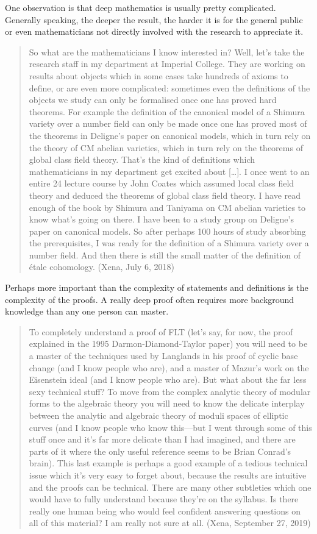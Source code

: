 \documentclass{amsart}
\theoremstyle{definition}
\theoremstyle{remark}
\numberwithin{equation}{section}
\begin{document}
One observation is that deep mathematics is usually pretty complicated. Generally speaking, the deeper the result, the harder it is for the general public or even mathematicians not directly involved with the research to appreciate it.
\begin{quote}
  So what are the mathematicians I know interested in? Well, let’s take the research staff in my department at Imperial College. They are working on results about objects which in some cases take hundreds of axioms to define, or are even more complicated: sometimes even the definitions of the objects we study can only be formalised once one has proved hard theorems. For example the definition of the canonical model of a Shimura variety over a number field can only be made once one has proved most of the theorems in Deligne's paper on canonical models, which in turn rely on the theory of CM abelian varieties, which in turn rely on the theorems of global class field theory. That's the kind of definitions which mathematicians in my department get excited about [\ldots]. I once went to an entire 24 lecture course by John Coates which assumed local class field theory and deduced the theorems of global class field theory. I have read enough of the book by Shimura and Taniyama on CM abelian varieties to know what's going on there. I have been to a study group on Deligne's paper on canonical models. So after perhaps 100 hours of study absorbing the prerequisites, I was ready for the definition of a Shimura variety over a number field. And then there is still the small matter of the definition of \'etale cohomology. (Xena, July 6, 2018)
\end{quote}
Perhaps more important than the complexity of statements and definitions is the complexity of the proofs. A really deep proof often requires more background knowledge than any one person can master.
\begin{quote}
  To completely understand a proof of FLT (let’s say, for now, the proof explained in the 1995 Darmon-Diamond-Taylor paper) you will need to be a master of the techniques used by Langlands in his proof of cyclic base change (and I know people who are), and a master of Mazur's work on the Eisenstein ideal (and I know people who are). But what about the far less sexy technical stuff? To move from the complex analytic theory of modular forms to the algebraic theory you will need to know the delicate interplay between the analytic and algebraic theory of moduli spaces of elliptic curves (and I know people who know this---but I went through some of this stuff once and it's far more delicate than I had imagined, and there are parts of it where the only useful reference seems to be Brian Conrad's brain). This last example is perhaps a good example of a tedious technical issue which it’s very easy to forget about, because the results are intuitive and the proofs can be technical. There are many other subtleties which one would have to fully understand because they're on the syllabus. Is there really one human being who would feel confident answering questions on all of this material? I am really not sure at all. (Xena, September 27, 2019)
\end{quote}
\end{document}
